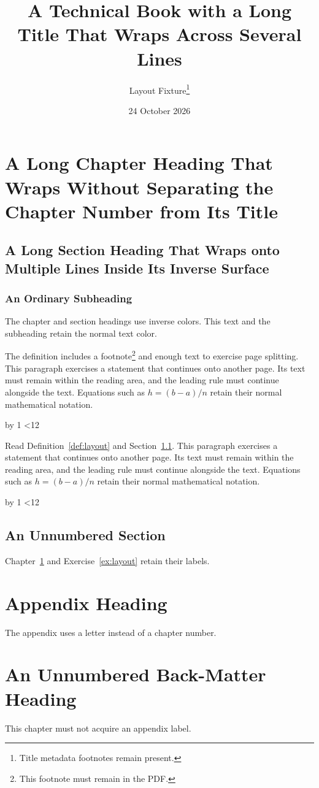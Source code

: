 \documentclass[11pt,a4paper,twoside,openright]{unbloated-book}
\title{A Technical Book with a Long Title That Wraps Across Several Lines}
\author{Layout Fixture\thanks{Title metadata footnotes remain present.}}
\date{24 October 2026}
\newcommand{\RepeatedParagraphs}{%
  \fixtureparagraph=0
  \loop
    This paragraph exercises a statement that continues onto another page.
    Its text must remain within the reading area, and the leading rule must
    continue alongside the text. Equations such as \(h=(b-a)/n\) retain
    their normal mathematical notation.\par
    \advance\fixtureparagraph by 1
  \ifnum\fixtureparagraph<12\repeat
}
\begin{document}
\frontmatter
\maketitle
\tableofcontents
\mainmatter
\setcounter{chapter}{99}
\setcounter{page}{999}
\chapter[Wrapped Chapter]{A Long Chapter Heading That Wraps Without Separating the Chapter Number from Its Title}
\label{ch:layout}
\section{A Long Section Heading That Wraps onto Multiple Lines Inside Its Inverse Surface}
\label{sec:layout}
\subsection{An Ordinary Subheading}
The chapter and section headings use inverse colors. This text and the
subheading retain the normal text color.

\begin{definition}
\label{def:layout}
The definition includes a footnote\footnote{This footnote must remain in the PDF.}
and enough text to exercise page splitting.
\RepeatedParagraphs
\end{definition}

\begin{exercise}
\label{ex:layout}
Read Definition~\ref{def:layout} and Section~\ref{sec:layout}.
\RepeatedParagraphs
\end{exercise}

\section*{An Unnumbered Section}
Chapter~\ref{ch:layout} and Exercise~\ref{ex:layout} retain their labels.


\appendix
\chapter{Appendix Heading}
The appendix uses a letter instead of a chapter number.
\backmatter
\chapter{An Unnumbered Back-Matter Heading}
This chapter must not acquire an appendix label.
\end{document}
